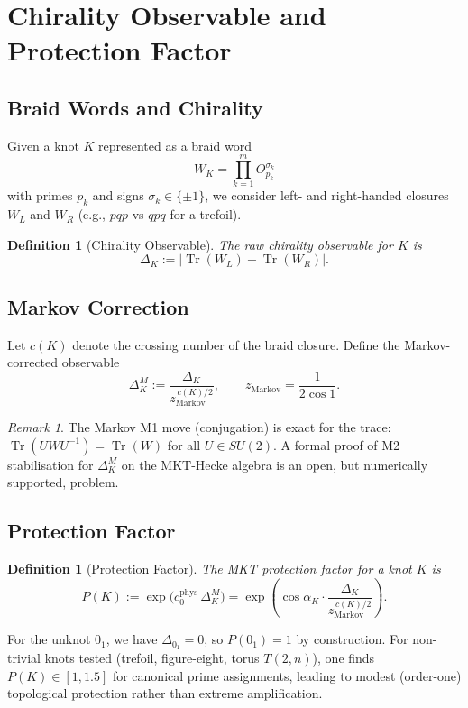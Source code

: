 \documentclass[11pt]{article}
\newtheorem{definition}[theorem]{Definition}
\theoremstyle{remark}
\newtheorem{remark}[theorem]{Remark}
\begin{document}
\section{Chirality Observable and Protection Factor}

\subsection{Braid Words and Chirality}

Given a knot $K$ represented as a braid word
\[
  W_K = \prod_{k=1}^{m} O_{p_k}^{\sigma_k}
\]
with primes $p_k$ and signs $\sigma_k \in \{\pm1\}$, we consider left- and
right-handed closures $W_L$ and $W_R$ (e.g., $pqp$ vs $qpq$ for a trefoil).

\begin{definition}[Chirality Observable]
The raw chirality observable for $K$ is
\[
  \Delta_K := \bigl|\operatorname{Tr}(W_L) - \operatorname{Tr}(W_R)\bigr|.
\]
\end{definition}

\subsection{Markov Correction}

Let $c(K)$ denote the crossing number of the braid closure. Define the
Markov-corrected observable
\[
  \Delta_K^M := \frac{\Delta_K}{z_{\text{Markov}}^{\,c(K)/2}},
  \qquad z_{\text{Markov}} = \frac{1}{2\cos 1}.
\]

\begin{remark}
The Markov M1 move (conjugation) is exact for the trace:
$\operatorname{Tr}(UWU^{-1})=\operatorname{Tr}(W)$ for all $U\in SU(2)$.
A formal proof of M2 stabilisation for $\Delta_K^M$ on the MKT-Hecke algebra
is an open, but numerically supported, problem.
\end{remark}

\subsection{Protection Factor}

\begin{definition}[Protection Factor]
The MKT protection factor for a knot $K$ is
\[
  P(K) := \exp\!\bigl(c_0^{\text{phys}}\,\Delta_K^M\bigr)
  = \exp\!\left(\cos\alpha_K \cdot 
    \frac{\Delta_K}{z_{\text{Markov}}^{\,c(K)/2}}\right).
\]
\end{definition}

For the unknot $0_1$, we have $\Delta_{0_1}=0$, so $P(0_1)=1$ by construction.
For non-trivial knots tested (trefoil, figure-eight, torus $T(2,n)$), one finds
$P(K)\in[1,1.5]$ for canonical prime assignments, leading to modest (order-one)
topological protection rather than extreme amplification.
\end{document}
